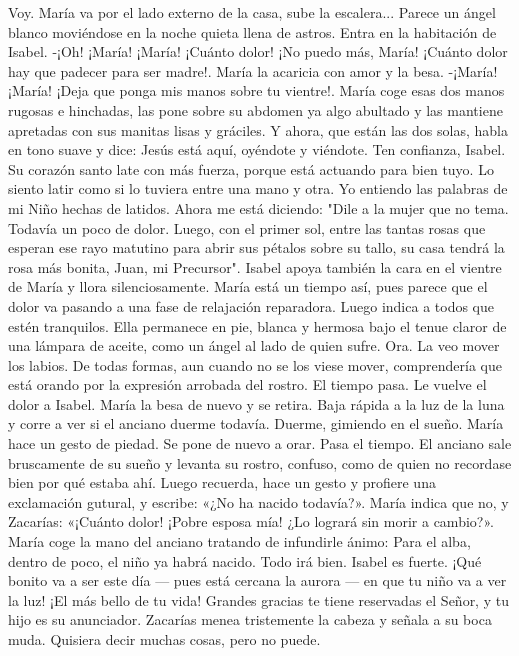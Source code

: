 \documentclass[12pt]{book} %
\begin{document}
Voy. 
María va por el lado externo de la casa, sube la escalera... Parece un ángel blanco moviéndose en la noche quieta llena 
de astros. Entra en la habitación de Isabel. 
-¡Oh! ¡María! ¡María! ¡Cuánto dolor! ¡No puedo más, María! ¡Cuánto dolor hay que padecer para ser madre!. 
María la acaricia con amor y la besa. 
-¡María! ¡María! ¡Deja que ponga mis manos sobre tu vientre!. 
María coge esas dos manos rugosas e hinchadas, las pone sobre su abdomen ya algo abultado y las mantiene apretadas 
con sus manitas lisas y gráciles. Y ahora, que están las dos solas, habla en tono suave y dice: 
Jesús está aquí, oyéndote y viéndote. Ten confianza, Isabel. Su corazón santo late con más fuerza, porque está 
actuando para bien tuyo. Lo siento latir como si lo tuviera entre una mano y otra. Yo entiendo las palabras de mi Niño hechas de latidos. Ahora me está diciendo: "Dile a la mujer que no tema. Todavía un poco de dolor. Luego, con el primer sol, entre las tantas rosas que esperan ese rayo matutino para abrir sus pétalos sobre su tallo, su casa tendrá la rosa más bonita, Juan, mi Precursor". 
Isabel apoya también la cara en el vientre de María y llora silenciosamente.                        María está un 
tiempo así, pues parece que el dolor va pasando a una fase de relajación reparadora. Luego indica a todos que estén tranquilos. Ella permanece en pie, blanca y hermosa bajo el tenue claror de una lámpara de aceite, como un ángel al lado de quien sufre. 
Ora. La veo mover los labios. De todas formas, aun cuando no se los viese mover, comprendería que está orando por la expresión arrobada del rostro. 
El tiempo pasa. Le vuelve el dolor a Isabel. María la besa de nuevo y se retira. Baja rápida a la luz de la luna y corre a ver 
si el anciano duerme todavía. Duerme, gimiendo en el sueño. María hace un gesto de piedad. Se pone de nuevo a orar. 
Pasa el tiempo. El anciano sale bruscamente de su sueño y levanta su rostro, confuso, como de quien no recordase bien por qué estaba ahí. Luego recuerda, hace un gesto y profiere una exclamación gutural, y escribe: «¿No ha nacido todavía?». 
María indica que no, y Zacarías: «¡Cuánto dolor! ¡Pobre esposa mía! ¿Lo logrará sin morir a cambio?». 
María coge la mano del anciano tratando de infundirle ánimo: 
Para el alba, dentro de poco, el niño ya habrá nacido. Todo irá bien. Isabel es fuerte. ¡Qué bonito va a ser este día — 
pues está cercana la aurora — en que tu niño va a ver la luz! ¡El más bello de tu vida! Grandes gracias te tiene reservadas el Señor, y tu hijo es su anunciador. 
Zacarías menea tristemente la cabeza y señala a su boca muda. Quisiera decir muchas cosas, pero no puede. 
\end{document}
